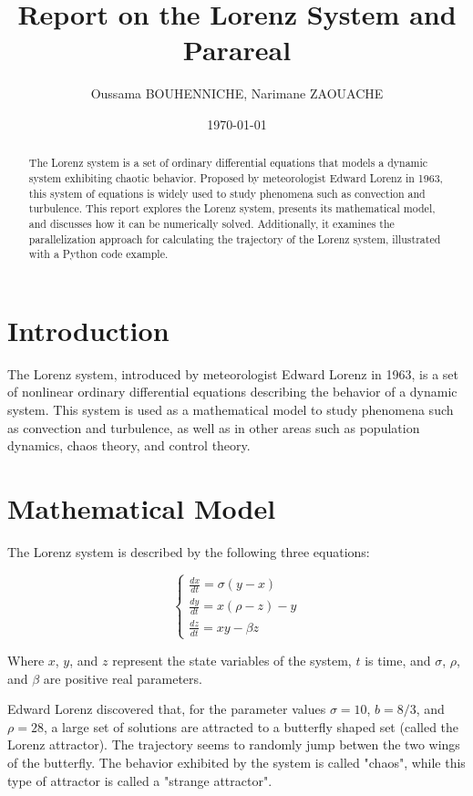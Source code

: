 \documentclass{article}
\title{Report on the Lorenz System and Parareal}
\author{Oussama  BOUHENNICHE, 
Narimane ZAOUACHE}
\date{\today}
\begin{document}
\maketitle

\begin{abstract}
    The Lorenz system is a set of ordinary differential equations that models a dynamic system exhibiting chaotic behavior. 
    Proposed by meteorologist Edward Lorenz in 1963, this system of equations is widely used to study phenomena such as convection and turbulence. 
    This report explores the Lorenz system, presents its mathematical model, and discusses how it can be numerically solved. 
    Additionally, it examines the parallelization approach for calculating the trajectory of the Lorenz system, illustrated with a Python code example.
    \end{abstract}

\section{Introduction}
 The Lorenz system, introduced by meteorologist Edward Lorenz in 1963, 
 is a set of nonlinear ordinary differential equations describing the behavior of a dynamic system. 
 This system is used as a mathematical model to study phenomena such as convection and turbulence, 
 as well as in other areas such as population dynamics, chaos theory, and control theory.
 
 \section{Mathematical Model}
 The Lorenz system is described by the following three equations:

 \[
\left\{
\begin{array}{ccc}
\frac{dx}{dt} = \sigma(y - x) \\
\frac{dy}{dt} = x(\rho - z) - y \\
\frac{dz}{dt} = xy - \beta z
\end{array}
\right.
\]

Where $x$, $y$, and $z$ represent the state variables of the system, 
$t$ is time, and $\sigma$, $\rho$, and $\beta$ are positive real parameters.

Edward Lorenz discovered that, for the parameter values 
$\sigma = 10$, $b = 8/3$, and $\rho = 28$, a large set of solutions are attracted to a butterfly shaped set (called the Lorenz attractor). 
The trajectory seems to randomly jump betwen the two wings of the butterfly. 
The behavior exhibited by the system is called "chaos", while this type of attractor is called a "strange attractor". 
\end{document}
